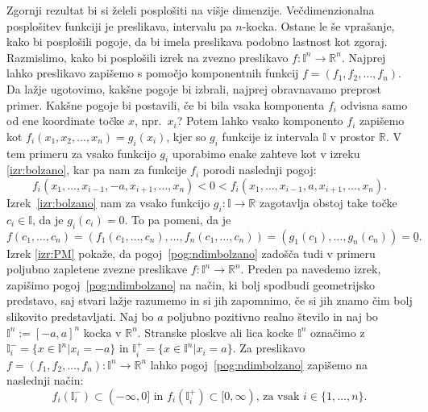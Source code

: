 \documentclass[mat1]{fmfdelo}
\newcommand{\R}{\mathbb R}
\newcommand{\I}{\mathbb I}
\newcommand{\0}{\underline{0}}
\begin{document}
Zgornji rezultat bi si želeli posplošiti na višje dimenzije. Večdimenzionalna posplošitev funkciji je preslikava, intervalu pa $n$-kocka. Ostane le še vprašanje, kako bi posplošili pogoje, da bi imela preslikava podobno lastnost kot zgoraj. Razmislimo, kako bi posplošili izrek na zvezno preslikavo $f : \I^n \to \R^n$. Najprej lahko preslikavo zapišemo s pomočjo komponentnih funkcij $f = (f_1, f_2, \dots, f_n)$. Da lažje ugotovimo, kakšne pogoje bi izbrali, najprej obravnavamo preprost primer. Kakšne pogoje bi postavili, če bi bila vsaka komponenta $f_i$ odvisna samo od ene koordinate točke $x$, npr.\ $x_i$? Potem lahko vsako komponento $f_i$ zapišemo kot $f_i(x_1, x_2, \dots, x_n) = g_i(x_i)$, kjer so $g_i$ funkcije iz intervala $\I$ v prostor $\R$. V tem primeru za vsako funkcijo $g_i$ uporabimo enake zahteve kot v izreku \ref{izr:bolzano}, kar pa nam za funkcije $f_i$ porodi naslednji pogoj: 
\begin{equation}\label{pog:ndimbolzano}
f_i(x_1, \dots, x_{i-1}, -a, x_{i+1}, \dots, x_n) < 0 < f_i(x_1, \dots, x_{i-1}, a, x_{i+1}, \dots, x_n).
\end{equation}
Izrek~\ref{izr:bolzano} nam za vsako funkcijo $g_i : \I \to \R$ zagotavlja obstoj take točke $c_i \in \I$, da je $g_i(c_i) = 0$. To pa pomeni, da je
$$f(c_1, \dots, c_n) = (f_1(c_1, \dots, c_n), \dots, f_n(c_1, \dots, c_n)) = (g_1(c_1), \dots, g_n(c_n)) = \0.$$
Izrek \ref{izr:PM} pokaže, da pogoj~\eqref{pog:ndimbolzano} zadošča tudi v primeru poljubno zapletene zvezne preslikave $f : \I^n \to \R^n$. Preden pa navedemo izrek, zapišimo pogoj~\eqref{pog:ndimbolzano} na način, ki bolj spodbudi geometrijsko predstavo, saj stvari lažje razumemo in si jih zapomnimo, če si jih znamo čim bolj slikovito predstavljati.
Naj bo $a$ poljubno pozitivno realno število in naj bo $\I^n := [-a, a]^n$ kocka v $\R^n$. Stranske ploskve ali lica kocke $\I^n$ označimo z $\I_i^- = \{x\in \I^n | x_i = -a\}$ in $\I_i^+ = \{x\in \I^n | x_i = a\}.$ Za preslikavo $f = (f_1, f_2, \dots, f_n) : \I^n \to \R^n$ lahko pogoj~\eqref{pog:ndimbolzano} zapišemo na naslednji način:
\begin{equation}\label{pog:PM}
f_i(\I_i^-) \subset (- \infty, 0]  \text{ in } f_i(\I_i^+) \subset [0, \infty) \text{, za vsak } i \in  \{1, \dots, n\}.
\end{equation}

\end{document}
